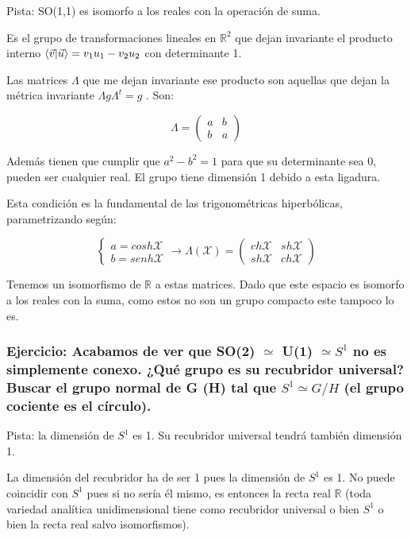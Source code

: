 \documentclass{article}
\begin{document}
Pista: SO(1,1) es isomorfo a los reales con la operación de suma.


\bigskip
Es el grupo de transformaciones lineales en $\mathds{R}^2$ que dejan invariante el producto interno $\braket{\Vec{v}|\Vec{u}}= v_1u_1 - v_2u_2$ con determinante 1.

\smallskip
Las matrices $\Lambda$ que me dejan invariante ese producto son aquellas que dejan la métrica invariante $\Lambda g \Lambda ^t =g$ . Son:

$$\Lambda = \left (\begin{array}{cc}
a  & b \\
b & a
\end{array} \right)$$

Además tienen que cumplir que $a^2 -b^2=1$ para que su determinante sea 0, pueden ser cualquier real. El grupo tiene dimensión 1 debido a esta ligadura.

Esta condición es la fundamental de las trigonométricas hiperbólicas, parametrizando según:

$$\left \lbrace \begin{array}{cc}
a=cosh \mathcal{X}  \\
b=senh \mathcal{X}
\end{array} \right .  \longrightarrow \Lambda (\mathcal{X})=\left ( \begin{array}{cc}
ch\mathcal{X} & sh\mathcal{X} \\
sh\mathcal{X}   & ch\mathcal{X}
\end{array}\right)$$

Tenemos un isomorfismo de $\mathds{R}$ a estas matrices. Dado que este espacio es isomorfo a los reales con la suma, como estos no son un grupo compacto este tampoco lo es.


\subsubsection{Ejercicio: Acabamos de ver que SO(2) $\simeq$ U(1) $\simeq S^1$  no es simplemente conexo. ¿Qué grupo es su recubridor universal? Buscar el grupo normal de G (H) tal que $S^1 \simeq G/H$ (el grupo cociente es el círculo).}

Pista: la dimensión de $S^1$ es 1. Su recubridor universal tendrá también dimensión 1.


\smallskip
La dimensión del recubridor ha de ser 1 pues la dimensión de $S^1$ es 1. No puede coincidir con $S^1$ pues si no sería él mismo, es entonces la recta real $\mathds{R}$ (toda variedad analítica unidimensional tiene como recubridor universal o bien $S^1$ o bien la recta real salvo isomorfismos).
\end{document}
